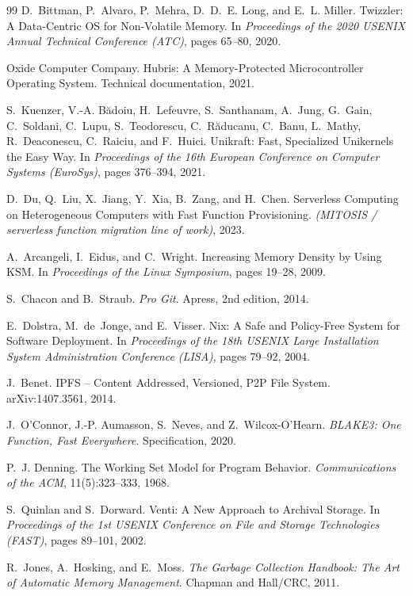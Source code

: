 \documentclass[10pt,twocolumn]{article}
\begin{document}
\begin{thebibliography}{99}
D.~Bittman, P.~Alvaro, P.~Mehra, D.~D.~E. Long, and E.~L. Miller.
Twizzler: A Data-Centric OS for Non-Volatile Memory.
In \emph{Proceedings of the 2020 USENIX Annual Technical Conference (ATC)},
pages 65--80, 2020.

Oxide Computer Company.
Hubris: A Memory-Protected Microcontroller Operating System.
Technical documentation, 2021.

S.~Kuenzer, V.-A. B\u{a}doiu, H.~Lefeuvre, S.~Santhanam, A.~Jung, G.~Gain,
C.~Soldani, C.~Lupu, S.~Teodorescu, C.~R\u{a}ducanu, C.~Banu, L.~Mathy,
R.~Deaconescu, C.~Raiciu, and F.~Huici.
Unikraft: Fast, Specialized Unikernels the Easy Way.
In \emph{Proceedings of the 16th European Conference on Computer Systems
(EuroSys)}, pages 376--394, 2021.

D.~Du, Q.~Liu, X.~Jiang, Y.~Xia, B.~Zang, and H.~Chen.
Serverless Computing on Heterogeneous Computers with Fast Function Provisioning.
\emph{(MITOSIS / serverless function migration line of work)}, 2023.

A.~Arcangeli, I.~Eidus, and C.~Wright.
Increasing Memory Density by Using KSM.
In \emph{Proceedings of the Linux Symposium}, pages 19--28, 2009.

S.~Chacon and B.~Straub.
\emph{Pro Git}.
Apress, 2nd edition, 2014.

E.~Dolstra, M.~de~Jonge, and E.~Visser.
Nix: A Safe and Policy-Free System for Software Deployment.
In \emph{Proceedings of the 18th USENIX Large Installation System Administration
Conference (LISA)}, pages 79--92, 2004.

J.~Benet.
IPFS -- Content Addressed, Versioned, P2P File System.
arXiv:1407.3561, 2014.

J.~O'Connor, J.-P. Aumasson, S.~Neves, and Z.~Wilcox-O'Hearn.
\emph{BLAKE3: One Function, Fast Everywhere}.
Specification, 2020.

P.~J. Denning.
The Working Set Model for Program Behavior.
\emph{Communications of the ACM}, 11(5):323--333, 1968.

S.~Quinlan and S.~Dorward.
Venti: A New Approach to Archival Storage.
In \emph{Proceedings of the 1st USENIX Conference on File and Storage Technologies
(FAST)}, pages 89--101, 2002.

R.~Jones, A.~Hosking, and E.~Moss.
\emph{The Garbage Collection Handbook: The Art of Automatic Memory Management}.
Chapman and Hall/CRC, 2011.


\end{thebibliography}
\end{document}
